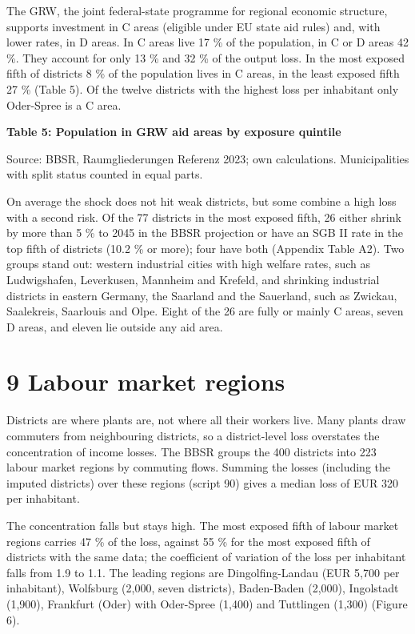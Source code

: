 \documentclass[
  11pt,
]{article}
\begin{document}
The GRW, the joint federal-state programme for regional economic
structure, supports investment in C areas (eligible under EU state aid
rules) and, with lower rates, in D areas. In C areas live 17 \% of the
population, in C or D areas 42 \%. They account for only 13 \% and 32 \%
of the output loss. In the most exposed fifth of districts 8 \% of the
population lives in C areas, in the least exposed fifth 27 \% (Table 5).
Of the twelve districts with the highest loss per inhabitant only
Oder-Spree is a C area.

\textbf{Table 5: Population in GRW aid areas by exposure quintile}



Source: BBSR, Raumgliederungen Referenz 2023; own calculations.
Municipalities with split status counted in equal parts.

On average the shock does not hit weak districts, but some combine a
high loss with a second risk. Of the 77 districts in the most exposed
fifth, 26 either shrink by more than 5 \% to 2045 in the BBSR projection
or have an SGB II rate in the top fifth of districts (10.2 \% or more);
four have both (Appendix Table A2). Two groups stand out: western
industrial cities with high welfare rates, such as Ludwigshafen,
Leverkusen, Mannheim and Krefeld, and shrinking industrial districts in
eastern Germany, the Saarland and the Sauerland, such as Zwickau,
Saalekreis, Saarlouis and Olpe. Eight of the 26 are fully or mainly C
areas, seven D areas, and eleven lie outside any aid area.

\hypertarget{labour-market-regions}{%
\section{9 Labour market regions}\label{labour-market-regions}}

Districts are where plants are, not where all their workers live. Many
plants draw commuters from neighbouring districts, so a district-level
loss overstates the concentration of income losses. The BBSR groups the
400 districts into 223 labour market regions by commuting flows. Summing
the losses (including the imputed districts) over these regions (script
90) gives a median loss of EUR 320 per inhabitant.

The concentration falls but stays high. The most exposed fifth of labour
market regions carries 47 \% of the loss, against 55 \% for the most
exposed fifth of districts with the same data; the coefficient of
variation of the loss per inhabitant falls from 1.9 to 1.1. The leading
regions are Dingolfing-Landau (EUR 5,700 per inhabitant), Wolfsburg
(2,000, seven districts), Baden-Baden (2,000), Ingolstadt (1,900),
Frankfurt (Oder) with Oder-Spree (1,400) and Tuttlingen (1,300) (Figure
6).
\end{document}
